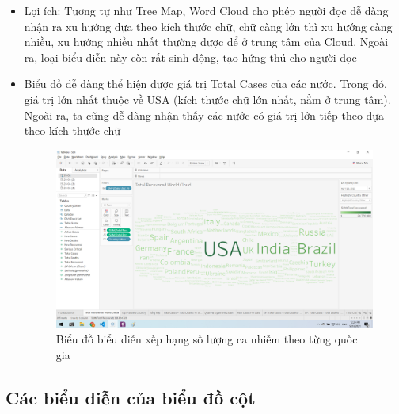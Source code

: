 \documentclass[a4paper, 12pt]{article}
\begin{document}
\begin{itemize}
    \item Lợi ích: Tương tự như Tree Map, Word Cloud cho phép người đọc dễ dàng nhận ra xu hướng dựa theo kích thước chữ, chữ càng lớn thì xu hướng càng nhiều, xu hướng nhiều nhất thường được để ở trung tâm của Cloud. Ngoài ra, loại biểu diễn này còn rất sinh động, tạo hứng thú cho người đọc
    \item Biểu đồ dễ dàng thể hiện được giá trị Total Cases của các nước. Trong đó, giá trị lớn nhất thuộc về USA (kích thước chữ lớn nhất, nằm ở trung tâm). Ngoài ra, ta cũng dễ dàng nhận thấy các nước có giá trị lớn tiếp theo dựa theo kích thước chữ
    \begin{figure}[H]
        \begin{center}
            \includegraphics[scale=0.4]{img/cloud.png}
            \caption{Biểu đồ biểu diễn xếp hạng số lượng ca nhiễm theo từng quốc gia}
        \end{center}
    \end{figure}
\end{itemize}

\subsection{Các biểu diễn của biểu đồ cột}
\end{document}
